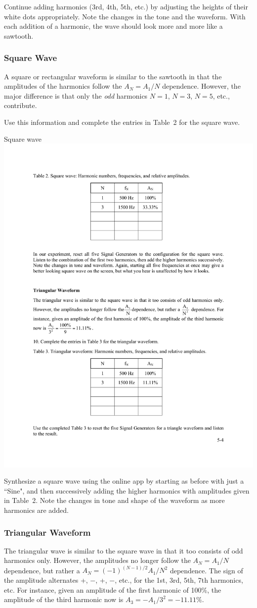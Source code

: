\documentclass[11pt]{NSF}
\begin{document}
Continue adding harmonics (3rd, 4th, 5th, etc.) by adjusting the
heights of their white dots appropriately.
Note the changes in the tone and the waveform.
With each addition of a harmonic, the wave should look more and 
more like a sawtooth.

\subsubsection{Square Wave}

A square or rectangular waveform is similar to the sawtooth 
in that the amplitudes of the harmonics follow the 
$A_N=A_1/N$ dependence. 
However, the major difference is that only the {\em odd}
harmonics $N=1$, $N=3$, $N=5$, etc., contribute.

Use this information and complete the entries in Table~2
for the square wave.
%
\begin{table}[hbtp]
\begin{center}
Square wave\\
\includegraphics[width=.35\textwidth]{tab5_2}
\label{t:2}
\end{center}
\end{table}

Synthesize a square wave using the online app by starting as
before with just a ``Sine", and then successively adding the
higher harmonics with amplitudes given in Table~2.
Note the changes in tone and shape of the waveform as more
harmonics are added.

\subsubsection{Triangular Waveform}

The triangular wave is similar to the square wave in that 
it too consists of odd harmonics only. However, 
the amplitudes no longer follow the $A_N=A_1/N$ dependence, 
but rather a $A_N = (-1)^{(N-1)/2} A_1/N^2$ dependence. 
The sign of the amplitude alternates +, $-$, +, $-$, etc.,
for the 1st, 3rd, 5th, 7th harmonics, etc.
For instance, given an amplitude of the first harmonic of 100\%, 
the amplitude of the third harmonic now is
$A_3 = -A_1/3^2 = -11.11\%$.
\end{document}
